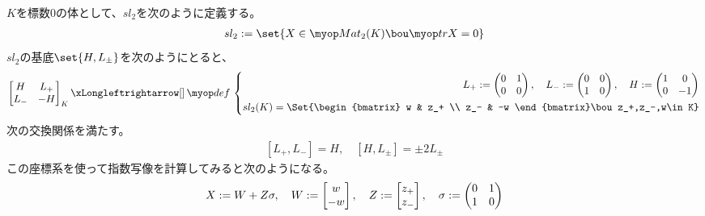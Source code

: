 {	\begin{example}[sl(2)]\label{eg:sl(2)の指数写像} %
		$K$を標数$0$の体として、$sl_2$を次のように定義する。
		\begin{equation*}\begin{split}
			sl_2 := \set{X\in\Mat_2(K)\bou \tr X = 0}
		\end{split}\end{equation*}
		$sl_2$の基底$\set{H,L_\pm}$を次のようにとると、
		\begin{equation*}\label{eq:sl2の基底系}\begin{split}
			\begin{bmatrix}
				H & L_+ \\ L_- & -H
			\end{bmatrix}_K \xiff{\dfn} \left\{\begin{split}
				L_+ := \begin{pmatrix}
					0 & 1 \\ 0 & 0
				\end{pmatrix},\quad L_- := \begin{pmatrix}
					0 & 0 \\ 1 & 0
				\end{pmatrix},\quad H := \begin{pmatrix}
					1 & 0 \\ 0 & -1
				\end{pmatrix} \\
				sl_2(K) = \Set{\begin{bmatrix}
					w & z_+ \\ z_- & -w
				\end{bmatrix}\bou z_+,z_-,w\in K}
			\end{split}\right.
		\end{split}\end{equation*}
		次の交換関係を満たす。
		\begin{equation*}\begin{split}
			[L_+,L_-] = H,\quad [H,L_\pm] = \pm 2L_\pm
		\end{split}\end{equation*}
		この座標系を使って指数写像を計算してみると次のようになる。
		\begin{equation*}\begin{split}
			& X := W + Z\sigma,\quad W := \bvec{w}{-w},\quad Z := \bvec{z_+}{z_-}
			,\quad \sigma := \begin{pmatrix}
				0 & 1 \\ 1 & 0
			\end{pmatrix} \\

\end{split}
\end{equation*}
\end{example}}
